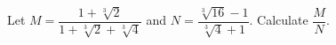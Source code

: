 Let $M=\dfrac{1+\sqrt[3]2}{1+\sqrt[3]2+\sqrt[3]4}$ and $N=\dfrac{\sqrt[3]{16}-1}{\sqrt[3]4+1}$. Calculate $\dfrac MN$.
